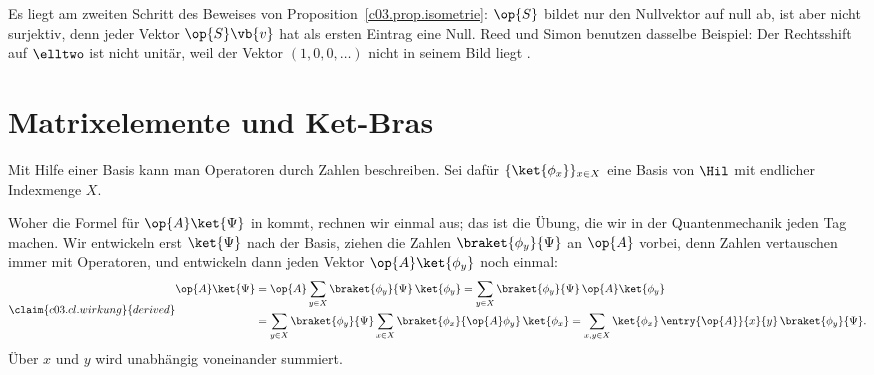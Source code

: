 \begin{vertiefung}
  Es liegt am zweiten Schritt des Beweises von Proposition~\ref{c03.prop.isometrie}: $\op{S}$
  bildet nur den Nullvektor auf null ab, ist aber nicht surjektiv, denn jeder Vektor
  $\op{S}\vb{v}$ hat als ersten Eintrag eine Null. Reed und Simon benutzen dasselbe Beispiel:
  Der Rechtsshift auf $\elltwo$ ist nicht unitär, weil der Vektor $(1, 0, 0, \dots)$ nicht in
  seinem Bild liegt .
\end{vertiefung}

\section{Matrixelemente und Ket-Bras}\label{c03.s11}

Mit Hilfe einer Basis kann man Operatoren durch Zahlen beschreiben. Sei dafür
$\{\ket{\phi_x}\}_{x \in X}$ eine Basis von $\Hil$ mit endlicher Indexmenge $X$.


Woher die Formel für $\op{A}\ket{\Psi}$ in  kommt, rechnen wir einmal aus; das ist
die Übung, die wir in der Quantenmechanik jeden Tag machen. Wir entwickeln erst $\ket{\Psi}$ nach
der Basis, ziehen die Zahlen $\braket{\phi_y}{\Psi}$ an $\op{A}$ vorbei, denn Zahlen vertauschen
immer mit Operatoren, und entwickeln dann jeden Vektor $\op{A}\ket{\phi_y}$ noch einmal:
\begin{equation}\label{c03.eq.wirkung}\claim{c03.cl.wirkung}{derived}
  \begin{aligned}
    \op{A}\ket{\Psi}
    &= \op{A} \sum_{y \in X} \braket{\phi_y}{\Psi}\, \ket{\phi_y}
     = \sum_{y \in X} \braket{\phi_y}{\Psi}\, \op{A}\ket{\phi_y} \\
    &= \sum_{y \in X} \braket{\phi_y}{\Psi} \sum_{x \in X} \braket{\phi_x}{\op{A}\phi_y}\, \ket{\phi_x}
     = \sum_{x, y \in X} \ket{\phi_x}\, \entry{\op{A}}{x}{y}\, \braket{\phi_y}{\Psi} .
  \end{aligned}
\end{equation}
Über $x$ und $y$ wird unabhängig voneinander summiert.


